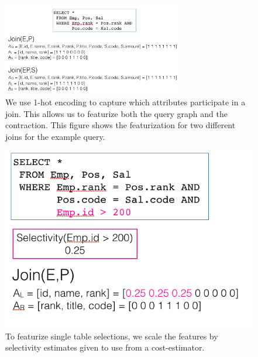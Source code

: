 \begin{figure}
    \centering
    \includegraphics[width=0.7\textwidth]{figs/featurization.png}
    \caption{We use 1-hot encoding to capture which attributes participate in a join. This allows us to featurize both the query graph and the contraction. This figure shows the featurization for two different joins for the example query. \label{feat}}
\end{figure}

\begin{figure}
    \centering
    \includegraphics[width=0.8\columnwidth]{figs/selectivity.png}
    \caption{To featurize single table selections, we scale the features by selectivity estimates given to use from a cost-estimator. \label{feat:sel}}
\end{figure}

